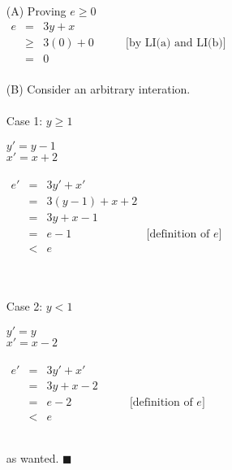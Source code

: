 \documentclass[12pt]{article}
\renewcommand{\qed}{\hfill$\blacksquare$}
\begin{document}
\hfill\begin{minipage}{\dimexpr\textwidth-10mm}
	\begin{itemize}
		\item [(A)] Proving $e \geq 0$\\
		      $\begin{array}{lcll}
				      e & =    & 3y + x          &                             \\
				        & \geq & 3(0) + 0 \qquad & \text{[by LI(a) and LI(b)]} \\
				        & =    & 0               &                             \\
			      \end{array}$
		\item [(B)] Consider an arbitrary interation.
		      \\\\
		      Case 1: $y \geq 1$

		      \hfill\begin{minipage}{\dimexpr\textwidth-20mm}
			      $y' = y-1$ \qquad [line 3]\\
			      $x' = x+2$ \qquad [line 3]
			      \\\\
			      $\begin{array}{lcll}
					      e' & = & 3y' + x'       & \\
					         & = & 3(y-1) + x + 2 & \\
					         & = & 3y + x -1      & \\
					         & = & e - 1          & \text{[definition of $e$]}\\
					         & < & e              &
				      \end{array}$\\
		      \end{minipage}
		      \\\\
		      Case 2: $y < 1$

		      \hfill\begin{minipage}{\dimexpr\textwidth-20mm}
			      $y' = y$\\
			      $x' = x-2$ \qquad [line 5]
			      \\\\
			      $\begin{array}{lcll}
					      e' & = & 3y'+x'     & \\
					         & = & 3y + x - 2 \qquad& \\
					         & = & e-2        & \text{[definition of $e$]}\\
					         & < & e          &
				      \end{array}$\\
		      \end{minipage}\\
		      as wanted. \qed

	\end{itemize}
\end{minipage}
\end{document}
